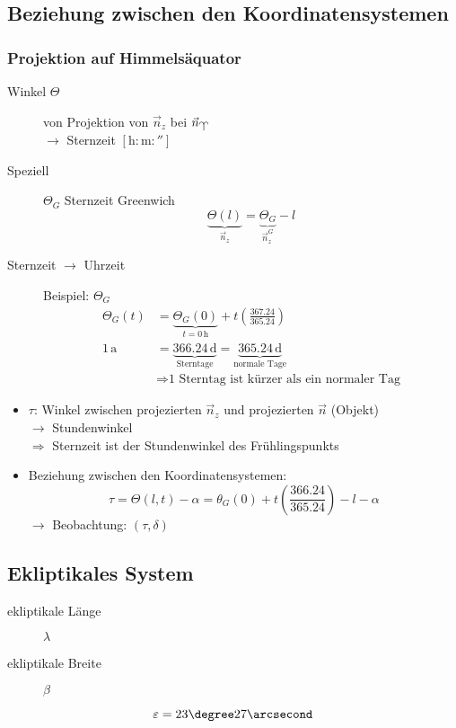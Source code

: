 \subsection{Beziehung zwischen den Koordinatensystemen}
\subsubsection{Projektion auf Himmelsäquator}
\begin{description}
    \item[Winkel $\Theta$] von Projektion von $\vec n_z$ bei $\vec n_{\vernal}$ \\
        $\rightarrow$ Sternzeit $[ \mathrm{h} : \mathrm{m} : \second ]$
    \item[Speziell] $\Theta_G$ Sternzeit Greenwich
        \[ \underbrace{\Theta(l)}_{\vec n_z} = \underbrace{\Theta_G}_{\vec n_z^G} - l \]
    \item[Sternzeit $\rightarrow$ Uhrzeit] Beispiel: $\Theta_G$
        \begin{align*}
            \Theta_G(t) &= \underbrace{\Theta_G(0)}_{t = 0\,\mathrm{h}} + t\left(\frac{367.24}{365.24}\right) \\
            1\,\mathrm{a} &= \underbrace{366.24\,\mathrm{d}}_{\text{Sterntage}} = \underbrace{365.24\,\mathrm{d}}_{\text{normale Tage}} \\
                          &\Rightarrow \text{1 Sterntag ist kürzer als ein normaler Tag}
        \end{align*}
\end{description}

\begin{itemize}
    \item $\tau$: Winkel zwischen projezierten $\vec n_z$ und projezierten $\vec n$ (Objekt) \\
        $\rightarrow$ Stundenwinkel\\
        $\Rightarrow$ Sternzeit ist der Stundenwinkel des Frühlingspunkts
    \item Beziehung zwischen den Koordinatensystemen:
        \[ \boxed{\tau = \Theta(l, t) - \alpha = \theta_G(0) + t \left(\frac{366.24}{365.24}\right) - l - \alpha} \]
        $\rightarrow$ Beobachtung: $(\tau, \delta)$
\end{itemize}

\subsection{Ekliptikales System}
\begin{description}
    \item[ekliptikale Länge] $\lambda$
    \item[ekliptikale Breite] $\beta$
\end{description}
\[ \varepsilon = 23\degree 27\arcsecond \]

